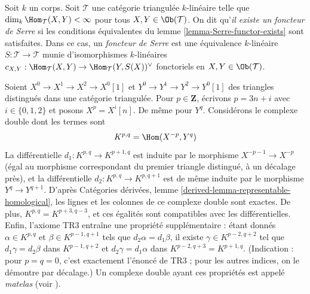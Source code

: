 \begin{definition}
\label{definition-Serre-functor}
Soit $k$ un corps. Soit $\mathcal{T}$ une catégorie triangulée
$k$-linéaire telle que $\dim_k \Hom_\mathcal{T}(X, Y) < \infty$
pour tous $X, Y \in \Ob(\mathcal{T})$. On dit qu'{\it il existe un foncteur
de Serre} si les conditions équivalentes du lemme \ref{lemma-Serre-functor-exists}
sont satisfaites. Dans ce cas, un {\it foncteur de Serre} est une équivalence $k$-linéaire
$S : \mathcal{T} \to \mathcal{T}$ munie d'isomorphismes $k$-linéaires
$c_{X, Y} : \Hom_\mathcal{T}(X, Y) \to \Hom_\mathcal{T}(Y, S(X))^\vee$
fonctoriels en $X, Y \in \Ob(\mathcal{T})$.
\end{definition}

\begin{remark}
\label{remark-matress}
Soient $X^0 \to X^1 \to X^2 \to X^0[1]$ et $Y^0 \to Y^1 \to Y^2 \to Y^0[1]$
des triangles distingués dans une catégorie triangulée. Pour
$p \in \mathbf{Z}$, écrivons $p = 3n + i$ avec $i \in \{0, 1, 2\}$ et
posons $X^p = X^i[n]$. De même pour $Y^q$. Considérons le complexe double
dont les termes sont
$$
K^{p, q} = \Hom(X^{-p}, Y^q)
$$
La différentielle $d_1 : K^{p, q} \to K^{p + 1, q}$ est induite par le morphisme
$X^{-p - 1} \to X^{-p}$ (égal au morphisme correspondant
du premier triangle distingué, à un décalage près),
et la différentielle $d_2 : K^{p, q} \to K^{p, q + 1}$ est de même induite
par le morphisme $Y^q \to Y^{q + 1}$. D'après
Catégories dérivées, lemme \ref{derived-lemma-representable-homological},
les lignes et les colonnes de ce complexe double sont exactes.
De plus, $K^{p, q} = K^{p + 3, q - 3}$, et ces
égalités sont compatibles avec les différentielles. Enfin, l'axiome TR3
entraîne une propriété supplémentaire : étant donnés
$\alpha \in K^{p, q}$ et $\beta \in K^{p - 1, q + 1}$ tels
que $d_2 \alpha = d_1 \beta$, il existe $\gamma \in K^{p - 2, q + 2}$
tel que
$d_1 \gamma = d_2 \beta $ dans $K^{p - 1, q + 2}$ et
$d_2 \gamma = d_1 \alpha $ dans $K^{p - 2, q + 3} = K^{p + 1, q}$.
(Indication : pour $p = q = 0$, c'est exactement l'énoncé de TR3 ;
pour les autres indices, on le démontre par décalage.)
Un complexe double ayant ces propriétés est appelé {\it matelas}
(voir \cite{Bondal-Kapranov}).
\end{remark}

